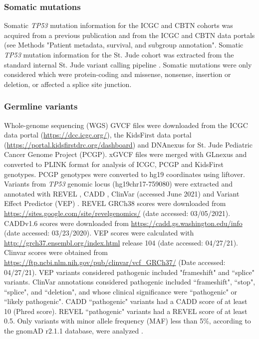 \subsubsection{Somatic mutations} Somatic \textit{TP53} mutation information for the ICGC and CBTN cohorts was acquired from a previous publication \cite{waszak_2018} and from the ICGC and CBTN data portals (see Methods\: "Patient metadata, survival, and subgroup annotation". Somatic \textit{TP53} mutation information for the St. Jude cohort was extracted from the standard internal St. Jude variant calling pipeline \cite{stjude}. Somatic mutations were only considered which were protein-coding and missense, nonsense, insertion or deletion, or affected a splice site junction.

\subsubsection{Germline variants} Whole-genome sequencing (WGS) GVCF files were downloaded from the ICGC data portal (\url{https://dcc.icgc.org/}), the KidsFirst data portal (\url{https://portal.kidsfirstdrc.org/dashboard}) and DNAnexus for St. Jude Pediatric Cancer Genome Project (PCGP). xGVCF files were merged with GLnexus \cite{glnexus} and converted to PLINK format for analysis of ICGC, PCGP and KidsFirst genotypes. PCGP genotypes were converted to hg19 coordinates using liftover. Variants from \textit{TP53} genomic locus (hg19\:chr17-759080) were extracted and annotated with REVEL \cite{revel_2016}, CADD \cite{cadd}, ClinVar (accessed June 2021) and Variant Effect Predictor (VEP) \cite{vep}. REVEL GRCh38 scores were downloaded from \url{https://sites.google.com/site/revelgenomics/} (date accessed: 03/05/2021). CADDv1.6 scores were downloaded from \url{https://cadd.gs.washington.edu/info} (date accessed: 03/23/2020). VEP scores were calculated with \url{http://grch37.ensembl.org/index.html} release 104 (date accessed: 04/27/21). Clinvar scores were obtained from \url{https://ftp.ncbi.nlm.nih.gov/pub/clinvar/vcf_GRCh37/} (Date accessed: 04/27/21). VEP variants considered pathogenic included "frameshift" and ``splice" variants. ClinVar annotations considered pathogenic included ``frameshift", ``stop", ``splice", and ``deletion", and whose clinical significance were ``pathogenic" or ``likely pathogenic". CADD ``pathogenic" variants had a CADD score of at least 10 (Phred score). REVEL ``pathogenic" variants had a REVEL score of at least 0.5. Only variants with minor allele frequency (MAF) less than 5\%, according to the gnomAD r2.1.1 database, were analyzed \cite{karczewski_2020}.

